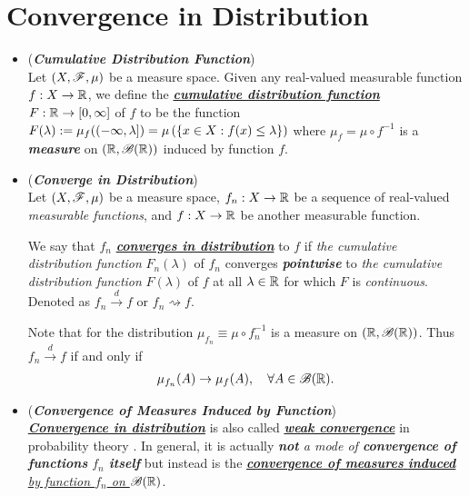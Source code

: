 \documentclass[11pt]{article}
\begin{document}
\section{Convergence in Distribution}
\begin{itemize}
\item \begin{definition} (\emph{\textbf{Cumulative Distribution Function}}) \citep{billingsley2008probability} \\
Let $(X,{\mathscr F}, \mu)$ be a measure space. Given any real-valued measurable function $f : X \rightarrow {\mathbb R}$, we define the \underline{\emph{\textbf{cumulative distribution function}}} $F : {\mathbb R} \rightarrow [0, \infty]$ of $f$ to be the function $F(\lambda) := \mu_{f}((-\infty, \lambda])= \mu\left(\left\{x \in  X : f(x) \le \lambda\right\}\right)$ where  $\mu_f = \mu\circ f^{-1}$ is a \emph{\textbf{measure}} on $({\mathbb R}, {\mathscr B}({\mathbb R}))$ induced by function $f$.  
\end{definition}

\item \begin{definition}  (\emph{\textbf{Converge in Distribution}}) \citep{van2000asymptotic}\\
Let $(X,{\mathscr F}, \mu)$ be a measure space, $f_n : X \rightarrow {\mathbb R}$ be a sequence of real-valued \emph{measurable functions}, and $f: X \rightarrow {\mathbb R}$ be another measurable function. 

We say that $f_n$ \underline{\emph{\textbf{converges in distribution}}} to $f$ if \emph{the cumulative distribution function} $F_n(\lambda)$ of $f_n$
converges \emph{\textbf{pointwise}} to \emph{the cumulative distribution function} $F(\lambda)$ of $f$ at all $\lambda \in  {\mathbb R}$ for which $F$ is \emph{continuous}. Denoted as \underline{$f_{n}\stackrel{d}{\rightarrow} f$} or \underline{$f_n \rightsquigarrow f$}. 

Note that for the distribution $\mu_{f_n}\equiv \mu \circ f_{n}^{-1}$ is a measure on $({\mathbb R}, {\mathscr B}({\mathbb R}))$. Thus $f_{n}\stackrel{d}{\rightarrow} f$ if and only if 
\begin{align*}
\mu_{f_n}(A)  \rightarrow \mu_f(A), \quad \forall A \in {\mathscr B}({\mathbb R}).
\end{align*} 
\end{definition}

\item \begin{remark} (\emph{\textbf{Convergence of Measures Induced by Function}})\\
\underline{\emph{\textbf{Convergence in distribution}}} is also called \underline{\emph{\textbf{weak convergence}}} in probability theory \citep{folland2013real}. In general,  it is actually \emph{\textbf{not} a mode of \textbf{convergence of functions} $f_n$ \textbf{itself}} but instead is the \underline{\emph{\textbf{convergence of measures} \textbf{induced} by function $f_n$ on ${\mathscr B}({\mathbb R})$}}.


\end{remark}
\end{itemize}
\end{document}
